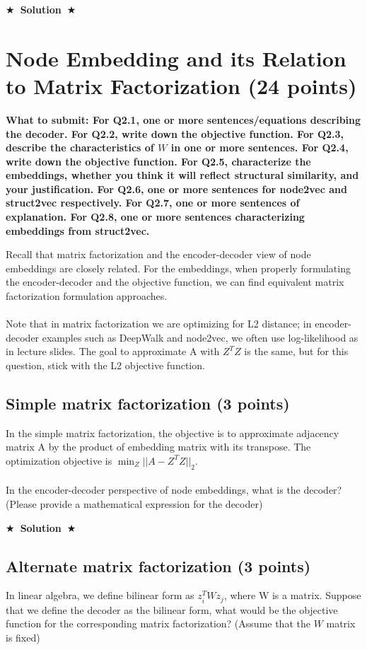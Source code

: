 \documentclass{article}
\numberwithin{figure}{section}
\newcommand{\Solution}[1]{{\medskip \color{red} \bf $\bigstar$~\sf \textbf{Solution}~$\bigstar$ \sf #1 } \bigskip}
\begin{document}
\Solution{}



\section{Node Embedding and its Relation to Matrix Factorization (24 points)}

\textbf{ What to submit: For Q2.1, one or more sentences/equations describing the decoder. For Q2.2, write down the objective function. For Q2.3, describe the characteristics of $W$ in one or more sentences. For Q2.4, write down the objective function. For Q2.5, characterize the embeddings, whether you think it will reflect structural similarity, and your justification. For Q2.6, one or more sentences for node2vec and struct2vec respectively. For Q2.7, one or more sentences of explanation. For Q2.8, one or more sentences characterizing embeddings from struct2vec.}

Recall that matrix factorization and the encoder-decoder view of node embeddings are closely related. For the embeddings, when properly formulating the encoder-decoder and the objective function, we can find equivalent matrix factorization formulation approaches.\\
\\
    Note that in matrix factorization we are optimizing for L2 distance; in encoder-decoder examples such as DeepWalk and node2vec, we often use log-likelihood as in lecture slides. The goal to approximate A with $Z^TZ$ is the same, but for this question, stick with the L2 objective function.
\subsection{Simple matrix factorization (3 points)}
In the simple matrix factorization, the objective is to approximate adjacency matrix A by the product of embedding matrix with its transpose. The optimization objective is $\min_Z ||A - Z^TZ||_2$.\\
\\
In the encoder-decoder perspective of node embeddings, what is the decoder? (Please provide a mathematical expression for the decoder)

\Solution{}



\subsection{Alternate matrix factorization (3 points)}
In linear algebra, we define bilinear form as $z_i^T W z_j$, where W is a matrix. Suppose that we define the decoder as the bilinear form, what would be the objective function for the corresponding matrix factorization? (Assume that the $W$ matrix is fixed)
\end{document}

